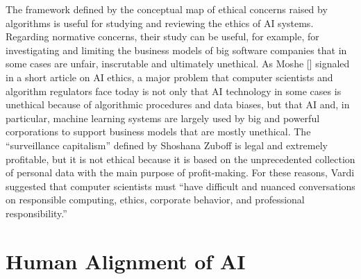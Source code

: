 The framework defined by the conceptual map of ethical concerns raised by algorithms is useful for studying and reviewing the ethics of AI systems. Regarding normative concerns, their study can be useful, for example, for investigating and limiting the business models of big software companies that in some cases are unfair, inscrutable and ultimately unethical. As Moshe \citeauthor{chap:7:Vardi:2022} [\mbox{\citeyear{chap:7:Vardi:2022}}] signaled in a short article on AI ethics, a major problem that computer scientists and algorithm regulators face today is not only that AI technology in some cases is unethical because of algorithmic procedures and data biases, but that AI and, in particular, machine learning systems are largely used by big and powerful corporations to support business models that are mostly unethical. The ``surveillance capitalism'' defined by Shoshana Zuboff is legal and extremely profitable, but it is not ethical because it is based on the unprecedented collection of personal data with the main purpose of profit-making. For these reasons, Vardi suggested that computer scientists must ``have difficult and nuanced conversations on responsible computing, ethics, corporate behavior, and professional responsibility.''

\section{\label{sec:7.7}Human Alignment of AI}

